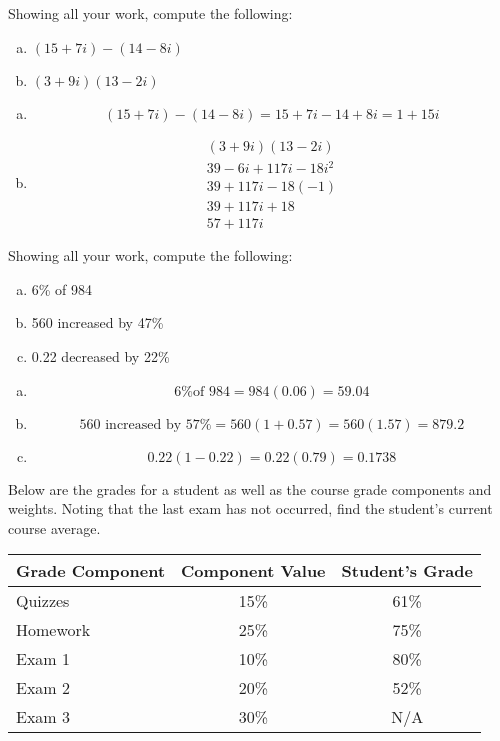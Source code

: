 \documentclass[12pt,letterpaper]{exam}
\begin{document}
\begin{questions}
\newpage
\question[10] Showing all your work, compute the following:
	\begin{enumerate}[(a)]
	\item $(15 + 7i) - (14 - 8i)$
	\item  $(3 + 9i)(13 - 2i)$
	\end{enumerate} \pspace

\sol 
\begin{enumerate}[(a)]
\item 
	\[
	(15 + 7i) - (14 - 8i)= 15 + 7i - 14 + 8i= 1 + 15i
	\] \pspace

\item 
	\[
	\begin{gathered}
	(3 + 9i)(13 - 2i) \\[0.3cm]
	39 - 6i + 117i - 18i^2 \\[0.3cm]
	39 + 117i - 18(-1) \\[0.3cm]
	39 + 117i + 18 \\[0.3cm]
	57 + 117i
	\end{gathered}
	\]
\end{enumerate}



\newpage
\question[10] Showing all your work, compute the following:
	\begin{enumerate}[(a)]
	\item 6\% of 984
	\item 560 increased by 47\%
	\item 0.22 decreased by 22\%
	\end{enumerate} \pspace

\sol 
\begin{enumerate}[(a)]
\item 
	\[
	\text{6\% of 984}= 984(0.06)= 59.04
	\] \pspace

\item 
	\[
	\text{560 increased by 57\%}= 560(1 + 0.57)= 560(1.57)= 879.2
	\] \pspace

\item 
	\[
	0.22(1 - 0.22)= 0.22(0.79)= 0.1738
	\]
\end{enumerate}



\newpage
\question[10] Below are the grades for a student as well as the course grade components and weights. Noting that the last exam has not occurred, find the student's current course average. \par
	\begin{table}[ht]
	\centering
	\begin{tabular}{lcc}
	Grade Component & Component Value & Student's Grade \\ \hline
	Quizzes & 15\% & 61\% \\
	Homework & 25\% & 75\% \\
	Exam 1 & 10\% & 80\% \\
	Exam 2 & 20\% & 52\% \\
	Exam 3 & 30\% & N/A \\
	\end{tabular}
	\end{table} \pspace


\end{questions}
\end{document}
